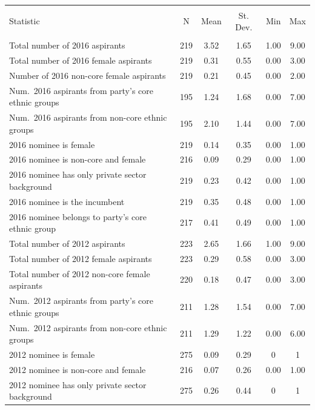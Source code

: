 
\begin{table}[!htbp] \centering 
  \caption{} 
  \label{} 
\begin{tabular}{@{\extracolsep{3pt}}lccccc} 
\\[-1.8ex]\hline 
\hline \\[-1.8ex] 
Statistic & \multicolumn{1}{c}{N} & \multicolumn{1}{c}{Mean} & \multicolumn{1}{c}{St. Dev.} & \multicolumn{1}{c}{Min} & \multicolumn{1}{c}{Max} \\ 
\hline \\[-1.8ex] 
Total number of 2016 aspirants & 219 & 3.52 & 1.65 & 1.00 & 9.00 \\ 
Total number of 2016 female aspirants & 219 & 0.31 & 0.55 & 0.00 & 3.00 \\ 
Number of 2016 non-core female aspirants & 219 & 0.21 & 0.45 & 0.00 & 2.00 \\ 
Num.~2016 aspirants from party's core ethnic groups & 195 & 1.24 & 1.68 & 0.00 & 7.00 \\ 
Num.~2016 aspirants from non-core ethnic groups & 195 & 2.10 & 1.44 & 0.00 & 7.00 \\ 
2016 nominee is female & 219 & 0.14 & 0.35 & 0.00 & 1.00 \\ 
2016 nominee is non-core and female & 216 & 0.09 & 0.29 & 0.00 & 1.00 \\ 
2016 nominee has only private sector background & 219 & 0.23 & 0.42 & 0.00 & 1.00 \\ 
2016 nominee is the incumbent & 219 & 0.35 & 0.48 & 0.00 & 1.00 \\ 
2016 nominee belongs to party's core ethnic group & 217 & 0.41 & 0.49 & 0.00 & 1.00 \\ 
Total number of 2012 aspirants & 223 & 2.65 & 1.66 & 1.00 & 9.00 \\ 
Total number of 2012 female aspirants & 223 & 0.29 & 0.58 & 0.00 & 3.00 \\ 
Total number of 2012 non-core female aspirants & 220 & 0.18 & 0.47 & 0.00 & 3.00 \\ 
Num.~2012 aspirants from party's core ethnic groups & 211 & 1.28 & 1.54 & 0.00 & 7.00 \\ 
Num.~2012 aspirants from non-core ethnic groups & 211 & 1.29 & 1.22 & 0.00 & 6.00 \\ 
2012 nominee is female & 275 & 0.09 & 0.29 & 0 & 1 \\ 
2012 nominee is non-core and female & 216 & 0.07 & 0.26 & 0.00 & 1.00 \\ 
2012 nominee has only private sector background & 275 & 0.26 & 0.44 & 0 & 1 \\ 

\end{tabular}
\end{table}
